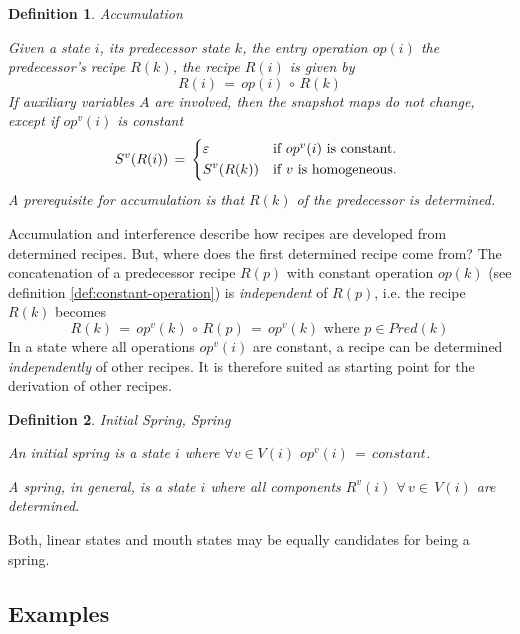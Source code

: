 \documentclass[12pt,a4paper]{scrartcl}
\newtheorem{definition}{Definition}
\begin{document}
\begin{definition} Accumulation

Given a state $i$, its predecessor state $k$, the entry operation $op(i)$
the predecessor's recipe $R(k)$, the recipe $R(i)$ is given by
\begin{equation}
       R(i)\,=\,op(i)\,\circ\,R(k)
\end{equation}
If auxiliary variables $A$ are involved, then the snapshot maps do not change,
except if $op^v(i)$ is constant
\begin{equation} \label{eq:accumulation-aux}
    S^v(R(i))\,=\,\begin{dcases*}
                  \varepsilon & if $op^v(i)$ is constant. \\
                  S^v(R(k))   & if $v$ is homogeneous.\\
                \end{dcases*}
\end{equation}
A prerequisite for accumulation is that $R(k)$ of the predecessor is 
determined.
\end{definition}
Accumulation and interference describe how recipes are developed from
determined recipes.  But, where does the first determined recipe come from?
The concatenation of a predecessor recipe $R(p)$ with constant operation
$op(k)$ (see definition \ref{def:constant-operation}) is \textit{independent}
of $R(p)$, i.e. the recipe $R(k)$ becomes
\begin{equation}
    R(k)\,=\,op^v(k)\,\circ\,R(p)\,=\,op^v(k)\,\,\mbox{where $p\in Pred(k)$}
\end{equation}
In a state where all operations $op^v(i)$ are constant, a recipe can be determined
\textit{independently} of other recipes. It is therefore suited as starting
point for the derivation of other recipes.
\begin{definition} Initial Spring, Spring \label{def:springs}

    An initial spring is a state $i$ where $\forall v \in V(i)$ $op^v(i)\,=\,constant$.

    A spring, in general, is a state $i$ where all components $R^v(i)$
    $\forall\,v\in\,V(i)$ are determined.
    
\end{definition}
Both, linear states and mouth states may be equally candidates for being a 
spring.

\subsection{Examples}
                 
\end{document}
